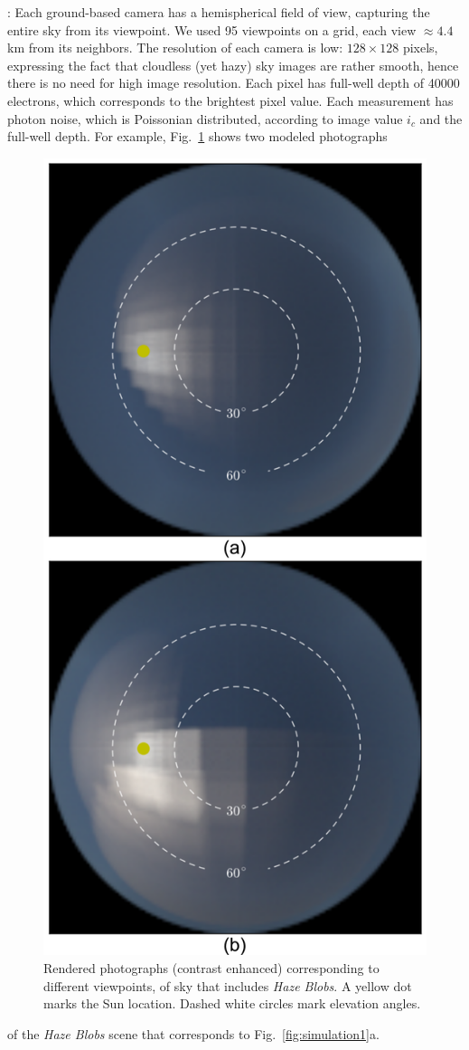 \documentclass[10pt,twocolumn,letterpaper]{article}
\newcommand{\yoavcomment}[1]{}
\renewcommand{\yoavcomment}[1]{#1} %
\begin{document}
: Each ground-based camera has a hemispherical field of view, capturing the entire sky from its viewpoint. We used 95 viewpoints on a grid, each view $\approx 4.4$km from its neighbors.
The resolution of each camera is low: $128\times 128$ pixels, expressing the fact that cloudless (yet hazy) sky images are rather smooth, hence there is no need for high image resolution. Each pixel has full-well depth of 40000 electrons, which corresponds to the brightest pixel value. Each measurement has photon noise, which is Poissonian distributed, according to image value $i_c$ and the full-well depth. For example, Fig.~\ref{fig:simulation-results1} shows two modeled photographs 
\begin{figure}
  \centering
  \yoavcomment{\includegraphics[width=0.8\columnwidth]{images/ref_images.pdf}}
  \caption{\small Rendered photographs (contrast enhanced) corresponding
   to different viewpoints, of sky that includes {\em Haze Blobs}. A yellow dot marks
    the Sun location. Dashed white circles mark elevation angles.}
  \label{fig:simulation-results1}
\end{figure}
of the  {\em Haze Blobs} scene that corresponds to Fig.~\ref{fig:simulation1}a.\\
\end{document}
